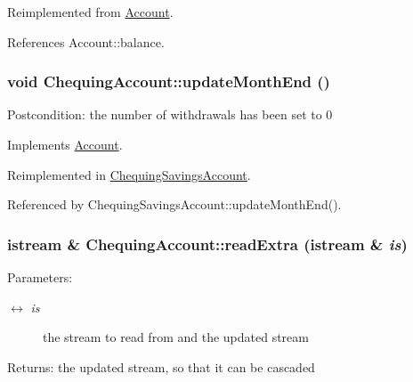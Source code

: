 Reimplemented from \hyperlink{classAccount_d239379460e2b8975bc8472514768850}{Account}.

References Account::balance.\hypertarget{classChequingAccount_03a0e06869ce9180c4e7ef2fdb39e616}{
\subsubsection[updateMonthEnd]{\setlength{\rightskip}{0pt plus 5cm}void ChequingAccount::updateMonthEnd ()}}
\label{classChequingAccount_03a0e06869ce9180c4e7ef2fdb39e616}


\begin{Desc}
\item[Postcondition:]the number of withdrawals has been set to 0 \end{Desc}


Implements \hyperlink{classAccount_3823d2d885625b78f83088946c257697}{Account}.

Reimplemented in \hyperlink{classChequingSavingsAccount_0bbd0c3b03b968fc2f80eb2a4fffa3f2}{ChequingSavingsAccount}.

Referenced by ChequingSavingsAccount::updateMonthEnd().\hypertarget{classChequingAccount_09de2d9912d5f817b651659404549111}{
\subsubsection[readExtra]{\setlength{\rightskip}{0pt plus 5cm}istream \& ChequingAccount::readExtra (istream \& {\em is})}}
\label{classChequingAccount_09de2d9912d5f817b651659404549111}


\begin{Desc}
\item[Parameters:]
\begin{description}
\item[\mbox{$\leftrightarrow$} {\em is}]the stream to read from and the updated stream \end{description}
\end{Desc}
\begin{Desc}
\item[Returns:]the updated stream, so that it can be cascaded \end{Desc}


